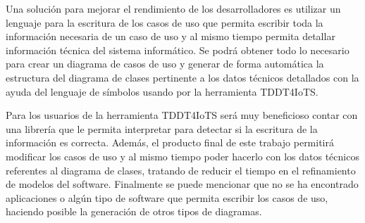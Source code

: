 Una solución para mejorar el rendimiento de los desarrolladores es utilizar un lenguaje para la escritura de los casos de uso que permita escribir toda la información necesaria de un caso de uso y al mismo tiempo permita detallar información técnica del sistema informático. Se podrá obtener todo lo necesario para crear un diagrama de casos de uso y generar de forma automática la estructura del diagrama de clases pertinente a los datos técnicos detallados con la ayuda del lenguaje de símbolos usando por la herramienta TDDT4IoTS. 

Para los usuarios de la herramienta TDDT4IoTS será muy beneficioso contar con una librería que le permita interpretar para detectar si la escritura de la información es correcta. Además, el producto final de este trabajo permitirá modificar los casos de uso y al mismo tiempo poder hacerlo con los datos técnicos referentes al diagrama de clases, tratando de reducir el tiempo en el refinamiento de modelos del software. Finalmente se puede mencionar que no se ha encontrado aplicaciones o algún tipo de software que permita escribir los casos de uso, haciendo posible la generación de otros tipos de diagramas. 